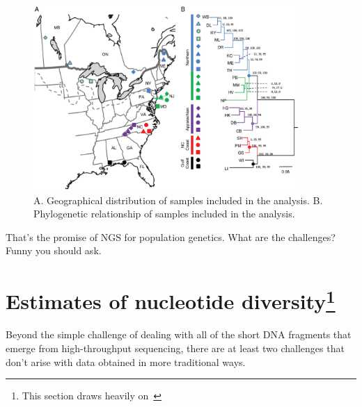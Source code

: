 \begin{figure}
\begin{center}
\includegraphics[width=0.9\textwidth]{wyeomyia-RAD.eps}
\end{center}
\caption{A. Geographical distribution of samples included in the
  analysis. B. Phylogenetic relationship of samples included in the analysis.}\label{fig:wyeomyia-RAD}
\end{figure}

That's the promise of NGS for population genetics. What are the
challenges? Funny you should ask.

\section*{Estimates of nucleotide diversity\footnote{This section draws heavily on~\cite{Lynch-2008}}}

Beyond the simple challenge of dealing with all of the short DNA
fragments that emerge from high-throughput sequencing, there are at
least two challenges that don't arise with data obtained in more
traditional ways.

